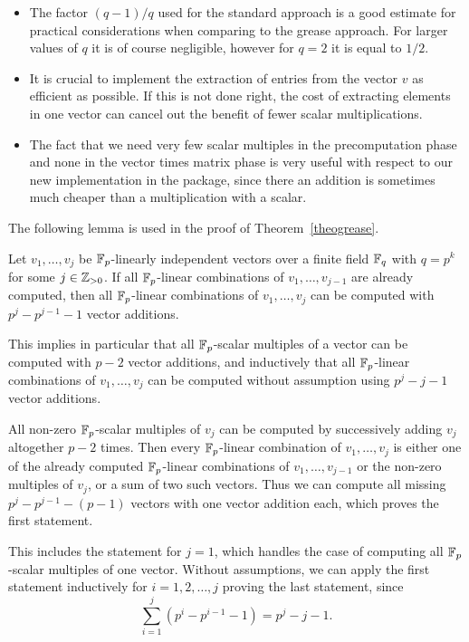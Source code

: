 \begin{Rems}
\begin{itemize}
\item The factor $(q-1)/q$ used for the standard approach is a
good estimate for practical considerations when comparing to
the grease approach. For larger values of $q$ it is of course negligible,
however for $q=2$ it is equal to $1/2$.
\item It is crucial to implement the extraction of entries
from the vector $v$ as efficient as possible. If this is not done
right, the cost of extracting elements in one vector can cancel out
the benefit of fewer scalar multiplications.
\item The fact that we need very few scalar multiples in the
precomputation phase and none in the vector times matrix phase is
very useful with respect to our new implementation in the
{\cvec} package, since there an addition is sometimes much cheaper
than a multiplication with a scalar.
\end{itemize}
\end{Rems}
 
The following lemma is used in the proof of Theorem~\ref{theogrease}.

\begin{Lemm}
\label{alllinkomb}
Let $v_1, \ldots, v_{j}$ be\/ $\mathbb{F}_p$-linearly  
independent vectors over a finite field\/ $\mathbb{F}_q$ with $q = p^k$
for some $j \in \mathbb{Z}_{> 0}$. If
all\/ $\mathbb{F}_p$-linear combinations of $v_1, \ldots, v_{j-1}$ are already
computed, then all\/ $\mathbb{F}_p$-linear combinations of $v_1, \ldots, v_j$ can
be computed with $p^j - p^{j-1} - 1$ vector additions.

This implies in particular that all\/ $\mathbb{F}_p$-scalar multiples of a vector
can be computed with $p-2$ vector additions, and inductively that
all\/ $\mathbb{F}_p$-linear combinations of $v_1, \ldots, v_j$ can be computed
without assumption using $p^j-j-1$ vector additions.
\end{Lemm}
\Proof All non-zero $\mathbb{F}_p$-scalar multiples of $v_j$ can be computed by
successively adding $v_j$ altogether $p-2$ times. Then every $\mathbb{F}_p$-linear
combination of $v_1, \ldots, v_j$ is either one of the already
computed $\mathbb{F}_p$-linear combinations of $v_1, \ldots, v_{j-1}$ or the
non-zero multiples of $v_j$, or a sum of two such vectors. Thus we 
can compute all missing $p^j - p^{j-1} - (p-1)$ vectors with one
vector addition each, which proves the first statement. 

This includes the statement for $j=1$, which handles the case of computing
all $\mathbb{F}_p$-scalar multiples of one vector. Without assumptions, we can
apply the first statement inductively for $i=1, 2, \ldots, j$ proving
the last statement, since
\[ \sum_{i=1}^j (p^i - p^{i-1} - 1) = p^j - j - 1. \]
\ProofEnd

